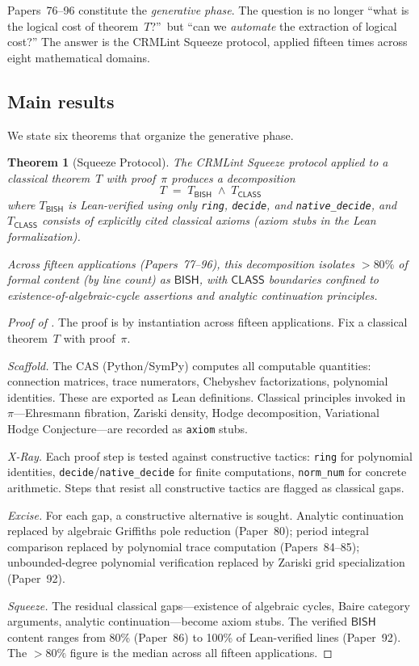 \documentclass[11pt]{article}
\theoremstyle{plain}
\newtheorem{theorem}{Theorem}[section]
\theoremstyle{definition}
\theoremstyle{remark}
\newcommand{\BISH}{\mathsf{BISH}}
\newcommand{\CLASS}{\mathsf{CLASS}}
\begin{document}
Papers~76--96 constitute the \emph{generative phase}.  The question
is no longer ``what is the logical cost of theorem~$T$?''\ but
``can we \emph{automate} the extraction of logical cost?''  The
answer is the CRMLint Squeeze protocol, applied fifteen times across
eight mathematical domains.


\subsection{Main results}

We state six theorems that organize the generative phase.

\begin{theorem}[Squeeze Protocol]\label{thm:A}
The CRMLint Squeeze protocol applied to a classical theorem~$T$
with proof~$\pi$ produces a decomposition
\[
  T \;=\; T_{\BISH} \;\wedge\; T_{\CLASS}
\]
where $T_{\BISH}$ is Lean-verified using only \texttt{ring},
\texttt{decide}, and \texttt{native\_decide}, and $T_{\CLASS}$
consists of explicitly cited classical axioms (axiom stubs in the
Lean formalization).

Across fifteen applications (Papers~77--96), this decomposition
isolates $>80\%$ of formal content (by line count) as $\BISH$,
with $\CLASS$ boundaries confined to existence-of-algebraic-cycle
assertions and analytic continuation principles.
\end{theorem}

\begin{proof}[Proof of ]
The proof is by instantiation across fifteen applications.  Fix a classical theorem~$T$ with proof~$\pi$.

\emph{Scaffold.}  The CAS (Python/SymPy) computes all computable quantities: connection matrices, trace numerators, Chebyshev factorizations, polynomial identities.  These are exported as Lean definitions.  Classical principles invoked in~$\pi$---Ehresmann fibration, Zariski density, Hodge decomposition, Variational Hodge Conjecture---are recorded as \texttt{axiom} stubs.

\emph{X-Ray.}  Each proof step is tested against constructive tactics: \texttt{ring} for polynomial identities, \texttt{decide}/\texttt{native\_decide} for finite computations, \texttt{norm\_num} for concrete arithmetic.  Steps that resist all constructive tactics are flagged as classical gaps.

\emph{Excise.}  For each gap, a constructive alternative is sought.  Analytic continuation replaced by algebraic Griffiths pole reduction (Paper~80); period integral comparison replaced by polynomial trace computation (Papers~84--85); unbounded-degree polynomial verification replaced by Zariski grid specialization (Paper~92).

\emph{Squeeze.}  The residual classical gaps---existence of algebraic cycles, Baire category arguments, analytic continuation---become axiom stubs.  The verified $\BISH$ content ranges from 80\% (Paper~86) to 100\% of Lean-verified lines (Paper~92).  The $>80\%$ figure is the median across all fifteen applications.
\end{proof}
\end{document}
